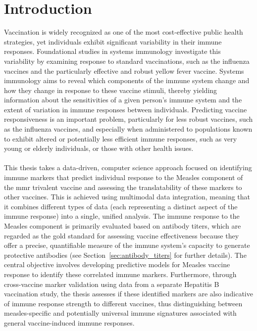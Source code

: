 \documentclass[12pt,a4paper]{report}
\begin{document}
\chapter{Introduction}
\setcounter{page}{1}
Vaccination is widely recognized as one of the most cost‑effective public health strategies, yet individuals exhibit significant variability in their immune responses. Foundational studies in systems immunology \cite{castrucci2018factors,brodin2017human} investigate this variability by examining response to standard vaccinations, such as the influenza vaccines and the particularly effective and robust yellow fever vaccine. Systems immunology aims to reveal which components of the immune system change and how they change in response to these vaccine stimuli, thereby yielding information about the sensitivities of a given person’s immune system and the extent of variation in immune responses between individuals. Predicting vaccine responsiveness is an important problem, particularly for less robust vaccines, such as the influenza vaccines, and especially when administered to populations known to exhibit altered or potentially less efficient immune responses, such as very young or elderly individuals, or those with other health issues.\\
\\
This thesis takes a data-driven, computer science approach focused on identifying immune markers that predict individual response to the Measles component of the \acrfull{mmr} trivalent vaccine and assessing the translatability of these markers to other vaccines. This is achieved using multimodal data integration, meaning that it combines different types of data (each representing a distinct aspect of the immune response) into a single, unified analysis. The immune response to the Measles component is primarily evaluated based on antibody titers, which are regarded as the gold standard for assessing vaccine effectiveness because they offer a precise, quantifiable measure of the immune system’s capacity to generate protective antibodies \cite{plotkin2010correlates} (see Section~\ref{sec:antibody_titers} for further details).  The central objective involves developing predictive models for Measles vaccine response to identify these correlated immune markers. Furthermore, through cross-vaccine marker validation using data from a separate Hepatitis B vaccination study, the thesis assesses if these identified markers are also indicative of immune response strength to different vaccines, thus distinguishing between measles-specific and potentially universal immune signatures associated with general vaccine-induced immune responses.\\
\end{document}
